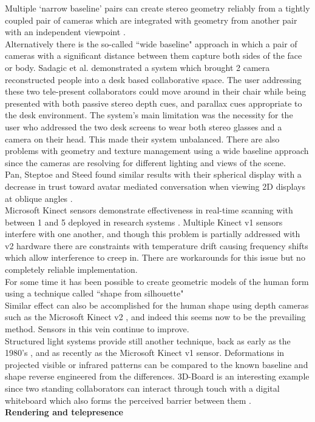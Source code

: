 Multiple `narrow baseline' pairs can create stereo geometry reliably from a tightly coupled pair of cameras which are integrated with geometry from another pair with an independent viewpoint \cite{Okutomi:1993ez, Cooke2002, Cooke2002a}. \\
Alternatively there is the so-called ``wide baseline" approach in which a pair of cameras with a significant distance between them capture both sides of the face or body. Sadagic et al. demonstrated a system which brought 2 camera reconstructed \cite{Sadagic2001} people into a desk based collaborative space. The user addressing these two tele-present collaborators could move around in their chair while being presented with both passive stereo depth cues, and parallax cues appropriate to the desk environment. The system's main limitation was the necessity for the user who addressed the two desk screens to wear both stereo glasses and a camera on their head. This made their system unbalanced.  There are also problems with geometry and texture management using a wide baseline approach since the cameras are resolving for different lighting and views of the scene.\\
      Pan, Steptoe and Steed found similar results with their spherical display with a decrease in trust toward avatar mediated conversation when viewing 2D displays at oblique angles \cite{pan2014comparing}.\\
Microsoft Kinect sensors demonstrate effectiveness in real-time scanning with between 1 and 5 deployed in research systems \cite{Mekuria2013}. Multiple Kinect v1 sensors interfere with one another, and though this problem is partially addressed with v2 hardware there are constraints with temperature drift causing frequency shifts which allow interference to creep in. There are workarounds for this issue but no completely reliable implementation.\\

                For some time it has been possible to create geometric models of the human form using a technique called ``shape from silhouette" \cite{Allard2006, Petit:2008tva,Matusik2000,Starck2008,Franco2003,Baumgart1975,Laurentini1994a,Grau2007,Waizenegger2011,Franco2009,Feldmann2009,Cooke2000, Starck2003}\\
                Similar effect can also be accomplished for the human shape using depth cameras such as the Microsoft Kinect v2 \cite{Maimone2011}, and indeed this seems now to be the prevailing method. Sensors in this vein continue to improve.\\
       Structured light systems provide still another technique, back as early as the 1980's \cite{Hu:1986ww}, and as recently as the Microsoft Kinect v1 sensor. Deformations in projected visible or infrared patterns can be compared to the known baseline and shape reverse engineered from the differences. 3D-Board is an interesting example since two standing collaborators can interact through touch with a digital whiteboard which also forms the perceived barrier between them \cite{Zillner2014}.\\
       \textbf{Rendering and telepresence}
       
